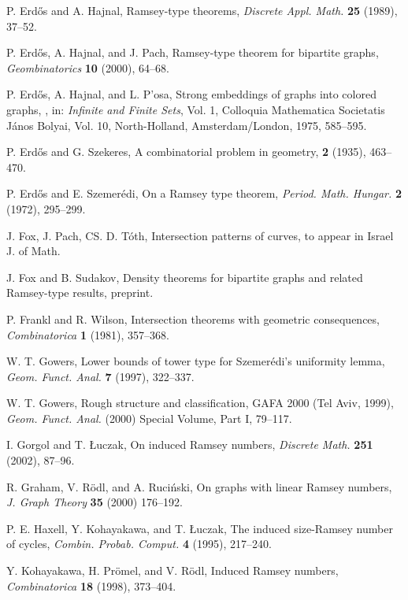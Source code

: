 \documentclass[11pt]{article}
\begin{document}
\begin{thebibliography}{}
P. Erd\H{o}s and A. Hajnal, Ramsey-type theorems, {\it Discrete
Appl. Math.} {\bf 25} (1989), 37--52.

P. Erd\H{o}s, A. Hajnal, and J. Pach, Ramsey-type theorem for
bipartite graphs, {\it Geombinatorics} {\bf 10} (2000), 64--68.

P. Erd\H{o}s, A. Hajnal, and L. P'osa, Strong embeddings of graphs
into colored graphs, , in: {\it Infinite and Finite Sets}, Vol. 1,
Colloquia Mathematica Societatis J\'anos Bolyai, Vol. 10,
North-Holland, Amsterdam/London, 1975, 585--595.

P. Erd\H{o}s and G. Szekeres,
\newblock A combinatorial problem in geometry,
 {\bf 2} (1935), 463--470.

P. Erd\H{o}s and E. Szemer\'edi, On a Ramsey type theorem,
{\it Period. Math. Hungar.} {\bf 2} (1972), 295--299.


J. Fox, J. Pach, CS. D. T\'oth, Intersection patterns of curves, to
appear in Israel J. of Math.

J. Fox and B. Sudakov, Density theorems for bipartite graphs and
related Ramsey-type results, preprint.

P. Frankl and R. Wilson, Intersection theorems with geometric
consequences, {\it Combinatorica} {\bf 1} (1981), 357--368.


W. T. Gowers, Lower bounds of tower type for Szemer\'edi's
uniformity lemma, {\it Geom. Funct. Anal.} {\bf 7} (1997), 322--337.

W. T. Gowers, Rough structure and classification,
GAFA 2000 (Tel Aviv, 1999),
{\it Geom. Funct. Anal.} (2000) Special Volume, Part I, 79--117.

I. Gorgol and T. \L uczak, On induced Ramsey numbers, {\it Discrete
Math.} {\bf 251} (2002), 87--96.

R. Graham, V. R\"odl, and A. Ruci\'nski, On graphs with linear
Ramsey numbers, {\it J. Graph Theory} {\bf 35} (2000) 176--192.


P. E. Haxell, Y. Kohayakawa, and T. \L uczak, The induced
size-Ramsey number of cycles, {\it Combin. Probab.
Comput.} {\bf 4} (1995), 217--240.

Y. Kohayakawa, H. Pr\"omel, and V. R\"odl, Induced Ramsey numbers,
{\it Combinatorica} {\bf 18} (1998), 373--404.


\end{thebibliography}
\end{document}
